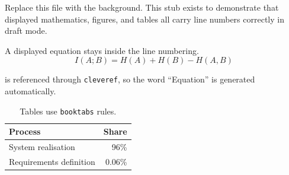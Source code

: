 Replace this file with the background.
This stub exists to demonstrate that displayed mathematics, figures, and tables all carry line numbers correctly in draft mode.

A displayed equation stays inside the line numbering.
\begin{equation}\label{eq:example}
  I(A;B) = H(A) + H(B) - H(A,B)
\end{equation}

 is referenced through \texttt{cleveref}, so the word ``Equation'' is generated automatically.

\begin{table}[t]
  \centering
  \caption{Tables use \texttt{booktabs} rules.}
  \label{tab:example}
  \begin{tabular}{lr}
    \toprule
    Process & Share \\
    \midrule
    System realisation & 96\% \\
    Requirements definition & 0.06\% \\
    \bottomrule
  \end{tabular}
\end{table}
